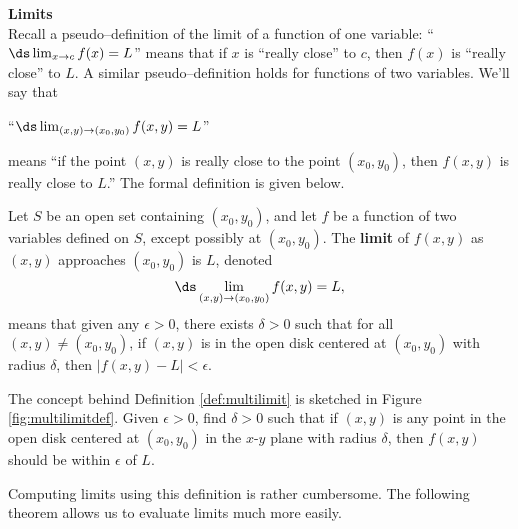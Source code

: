 \noindent\textbf{\large Limits}\\

Recall a pseudo--definition of the limit of a function of one variable: ``$\ds \lim_{x\to c}f(x) = L$'' means that if $x$ is ``really close'' to $c$, then $f(x)$ is ``really close'' to $L$. A similar pseudo--definition holds for functions of two variables. We'll say that 
\enlargethispage{3\baselineskip}

\begin{center}
``$\ds \lim_{(x,y)\to (x_0,y_0)} f(x,y) = L$'' \end{center}
means ``if the point $(x,y)$ is really close to the point $(x_0,y_0)$, then $f(x,y)$ is really close to $L$.'' The formal definition is given below.

{Let $S$ be an open set containing $(x_0,y_0)$, and let $f$ be a function of two variables defined on $S$, except possibly at $(x_0,y_0)$. 
The \textbf{limit} of $f(x,y)$ as $(x,y)$ approaches $(x_0,y_0)$ is $L$, denoted $$\ds \lim_{(x,y)\to (x_0,y_0)} f(x,y) = L,$$
means that given any $\epsilon>0$, there exists $\delta>0$ such that for all  $(x,y)\neq (x_0,y_0)$, if $(x,y)$ is in the open disk centered at $(x_0,y_0)$ with radius $\delta$, then $|f(x,y) - L|<\epsilon.$
}


The concept behind Definition \ref{def:multilimit} is sketched in Figure \ref{fig:multilimitdef}. Given $\epsilon>0$, find $\delta>0$ such that if $(x,y)$ is any point in the open disk centered at $(x_0,y_0)$ in the $x$-$y$ plane with radius $\delta$, then $f(x,y)$ should be within $\epsilon$ of $L$. 

Computing limits using this definition is rather cumbersome. The following theorem allows us to evaluate limits much more easily.



